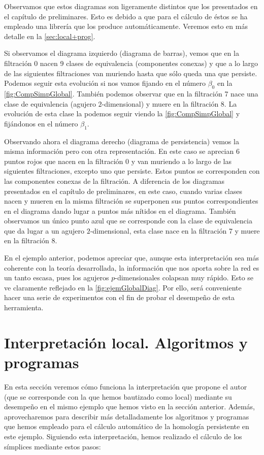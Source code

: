 \documentclass[12pt, a4paper, twoside]{book}
\numberwithin{equation}{section}
\theoremstyle{definition}
\newenvironment{ejem}
  {\pushQED{\qed}\renewcommand{\qedsymbol}{$\blacktriangleleft$}\ejemplo}
  {\popQED\endejemplo}
\theoremstyle{remark}
\theoremstyle{plain}
\begin{document}
\begin{ejem}
	Observamos que estos diagramas son ligeramente distintos que los 
	presentados en el capítulo de preliminares. Esto es debido a que para
	el cálculo de éstos se ha empleado una librería que los produce 
	automáticamente. Veremos esto en más detalle en la 
	\autoref{sec:local+prog}.

	Si observamos el diagrama izquierdo (diagrama de barras), vemos que en 
	la filtración 0 nacen 9 clases de equivalencia (componentes conexas) y
	que a lo largo de las siguientes filtraciones van muriendo hasta que 
	sólo queda una que persiste. Podemos seguir esta evolución si nos 
	vamos fijando en el número $\beta_{0}$ en  
	la \autoref{fig:CompSimpGlobal}. También podemos observar que en la 
	filtración 7 nace una clase de equivalencia (agujero $2$-dimensional) 
	y muere en la filtración 8. La evolución de esta clase la podemos 
	seguir viendo la \autoref{fig:CompSimpGlobal} y fijándonos en el 
	número $\beta_{1}$.

	Observando ahora el diagrama derecho (diagrama de persistencia) vemos 
	la misma información pero con otra representación. En este caso se 
	aprecian 6 puntos rojos que nacen en la filtración 0 y van muriendo a 
	lo largo de las siguientes filtraciones, excepto uno que persiste. 
	Estos puntos se corresponden 
	con las componentes conexas de la filtración. A diferencia de los 
	diagramas presentados en el capítulo de preliminares, en este caso, 
	cuando varias clases nacen y mueren en la misma filtración se 
	superponen sus puntos correspondientes en el diagrama dando lugar a 
	puntos más nítidos en el diagrama. También observamos un único punto 
	azul que se corresponde con la clase de equivalencia que da lugar a un
	agujero $2$-dimensional, esta clase nace en la filtración 7 y muere en
	la filtración 8.
	\end{ejem}

	En el ejemplo anterior, podemos apreciar que, aunque esta 
	interpretación sea más coherente con la teoría desarrollada, la 
	información que nos aporta sobre la red es un tanto escasa, pues los 
	agujeros $p$-dimensionales colapsan muy rápido. Esto se ve claramente 
	reflejado en la \autoref{fig:ejemGlobalDiag}. Por ello, 
	será conveniente hacer una serie de experimentos con el fin de probar
	el desempeño de esta herramienta.

	\section{Interpretación local. Algoritmos y programas}
	\label{sec:local+prog}
	En esta sección veremos cómo funciona la interpretación que propone 
	el autor (que se corresponde con la que hemos bautizado como local) 
	mediante su desempeño en el mismo ejemplo que hemos visto en la 
	sección anterior. Además, aprovecharemos para describir más 
	detalladamente los algoritmos y programas que hemos empleado para el 
	cálculo automático de la homología persistente en este ejemplo. 
	Siguiendo esta interpretación, hemos realizado el cálculo de los 
	símplices mediante estos pasos:
\end{document}
